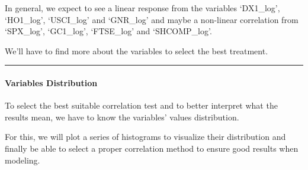 \documentclass[
]{article}
\begin{document}
In general, we expect to see a linear response from the variables
`DX1\_log', `HO1\_log', `USCI\_log' and `GNR\_log' and maybe a
non-linear correlation from `SPX\_log', `GC1\_log', `FTSE\_log' and
`SHCOMP\_log'.

We'll have to find more about the variables to select the best
treatment.

\begin{center}\rule{0.5\linewidth}{0.5pt}\end{center}

\hypertarget{variables-distribution}{%
\paragraph{Variables Distribution}\label{variables-distribution}}

To select the best suitable correlation test and to better interpret
what the results mean, we have to know the variables' values
distribution.

For this, we will plot a series of histograms to visualize their
distribution and finally be able to select a proper correlation method
to ensure good results when modeling.
\end{document}
